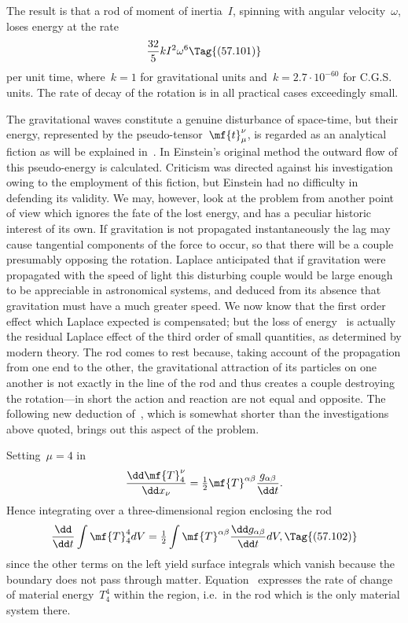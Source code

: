 \documentclass[12pt]{book}
\begin{document}
The result is that a rod of moment of inertia~$I$, spinning with angular velocity~$\omega$, loses energy at the rate
\[
\frac{32}{5} k I^2 \omega^6
\Tag{(57.101)}
\]
per unit time, where~$k = 1$ for gravitational units and~$k=2.7\cdot10^{-60}$ for C.G.S. units.
The rate of decay of the rotation is in all practical cases exceedingly small.

The gravitational waves constitute a genuine disturbance of space-time, but their energy, represented by the
pseudo-tensor~$\mf{t}^\nu_\mu$, is regarded as an analytical fiction as will be explained in~.
In Einstein's original method the outward flow of this pseudo-energy is calculated.
Criticism was directed against his investigation owing to the employment of this fiction,
but Einstein had no difficulty in defending its validity.
We may, however, look at the problem from another point of view which ignores the fate of the lost energy,
and has a peculiar historic interest of its own.
If gravitation is not propagated instantaneously the lag may cause tangential components of the force to occur,
so that there will be a couple presumably opposing the rotation.
 Laplace anticipated that if gravitation were propagated with the speed of light this disturbing couple
would be large enough to be appreciable in astronomical systems, and deduced from its absence that gravitation
must have a much greater speed.
We now know that the first order effect which Laplace expected is compensated;
but the loss of energy~ is actually the residual Laplace effect of the third order of small quantities,
as determined by modern theory.
The rod comes to rest because, taking account of the propagation from one end to the other,
the gravitational attraction of its particles on one another is not exactly in the line of the rod and thus
creates a couple destroying the rotation---in short the action and reaction are not equal and opposite.
The following new deduction of~, which is somewhat shorter than the investigations above quoted,
brings out this aspect of the problem.

Setting~$\mu=4$ in~
\[
\frac{\dd\mf{T}^\nu_4}{\dd x_\nu} = \tfrac{1}{2}\mf{T}^{\alpha\beta}\frac{g_{\alpha\beta}}{\dd t}.
\]
Hence integrating over a three-dimensional region enclosing the rod
\[
\frac{\dd}{\dd t} \int\mf{T}^4_4 dV = \tfrac{1}{2}\int\mf{T}^{\alpha\beta}\frac{\dd g_{\alpha\beta}}{\dd t} dV,
\Tag{(57.102)}
\]
since the other terms on the left yield surface integrals which vanish because the boundary does not pass through
matter.
Equation~ expresses the rate of change of material energy~$T^4_4$ within the region,
i.e.\ in the rod which is the only material system there.
\end{document}
